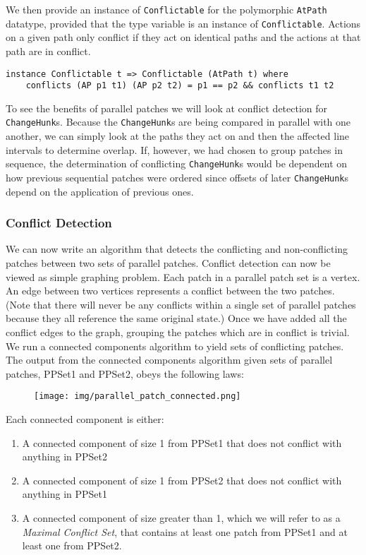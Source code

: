 \documentclass[]{article}
\makeatletter
\def\maxwidth{\ifdim\Gin@nat@width>\linewidth\linewidth
\else\Gin@nat@width\fi}
\let\Oldincludegraphics\includegraphics
\renewcommand{\includegraphics}[1]{\Oldincludegraphics[width=\maxwidth]{#1}}
\makeatother
\begin{document}
We then provide an instance of \texttt{Conflictable} for the polymorphic
\texttt{AtPath} datatype, provided that the type variable is an instance
of \texttt{Conflictable}. Actions on a given path only conflict if they
act on identical paths and the actions at that path are in conflict.

\begin{verbatim}
instance Conflictable t => Conflictable (AtPath t) where
    conflicts (AP p1 t1) (AP p2 t2) = p1 == p2 && conflicts t1 t2
\end{verbatim}

To see the benefits of parallel patches we will look at conflict
detection for \texttt{ChangeHunk}s. Because the \texttt{ChangeHunk}s are
being compared in parallel with one another, we can simply look at the
paths they act on and then the affected line intervals to determine
overlap. If, however, we had chosen to group patches in sequence, the
determination of conflicting \texttt{ChangeHunk}s would be dependent on
how previous sequential patches were ordered since offsets of later
\texttt{ChangeHunk}s depend on the application of previous ones.

\subsubsection{Conflict Detection}

We can now write an algorithm that detects the conflicting and
non-conflicting patches between two sets of parallel patches. Conflict
detection can now be viewed as simple graphing problem. Each patch in a
parallel patch set is a vertex. An edge between two vertices represents
a conflict between the two patches. (Note that there will never be any
conflicts within a single set of parallel patches because they all
reference the same original state.) Once we have added all the conflict
edges to the graph, grouping the patches which are in conflict is
trivial. We run a connected components algorithm to yield sets of
conflicting patches. The output from the connected components algorithm
given sets of parallel patches, PPSet1 and PPSet2, obeys the following
laws:

\begin{figure}[Figure 4]
\centering
\texttt{[image: img/parallel\_patch\_connected.png]}
\caption{}
\end{figure}

Each connected component is either: 
\begin{enumerate}[1.]
\item
A connected component of size 1 from PPSet1 that does not conflict with anything in PPSet2 
\item
A connected component of size 1 from PPSet2 that does not conflict with
anything in PPSet1 
\item
A connected component of size greater than 1,
which we will refer to as a \emph{Maximal Conflict Set}, that contains
at least one patch from PPSet1 and at least one from PPSet2.
\end{enumerate}
\end{document}
